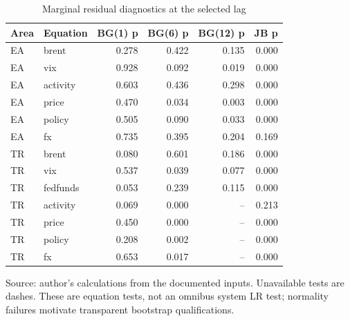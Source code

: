 \begin{table}[htbp]
\centering
\footnotesize
\caption{Marginal residual diagnostics at the selected lag}
\begin{tabularx}{\linewidth}{Xlrrrr}
\toprule
Area & Equation & BG(1) p & BG(6) p & BG(12) p & JB p \\
\midrule
EA & brent & 0.278 & 0.422 & 0.135 & 0.000 \\
EA & vix & 0.928 & 0.092 & 0.019 & 0.000 \\
EA & activity & 0.603 & 0.436 & 0.298 & 0.000 \\
EA & price & 0.470 & 0.034 & 0.003 & 0.000 \\
EA & policy & 0.505 & 0.090 & 0.033 & 0.000 \\
EA & fx & 0.735 & 0.395 & 0.204 & 0.169 \\
TR & brent & 0.080 & 0.601 & 0.186 & 0.000 \\
TR & vix & 0.537 & 0.039 & 0.077 & 0.000 \\
TR & fedfunds & 0.053 & 0.239 & 0.115 & 0.000 \\
TR & activity & 0.069 & 0.000 & -- & 0.213 \\
TR & price & 0.450 & 0.000 & -- & 0.000 \\
TR & policy & 0.208 & 0.002 & -- & 0.000 \\
TR & fx & 0.653 & 0.017 & -- & 0.000 \\
\bottomrule
\end{tabularx}
\par\vspace{3pt}\begin{minipage}{\linewidth}\footnotesize Source: author's calculations from the documented inputs.\allowbreak{} Unavailable tests are dashes.\allowbreak{} These are equation tests, not an omnibus system LR test; normality failures motivate transparent bootstrap qualifications.\allowbreak{}\end{minipage}
\end{table}
